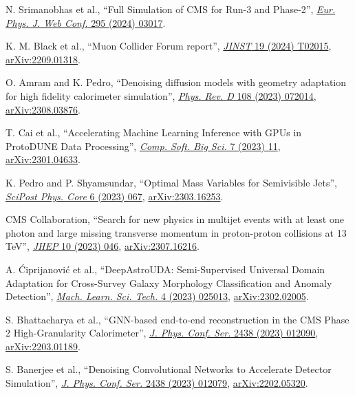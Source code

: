 \begin{nbdescription}[leftmargin=12pt,font=\normalfont,labelsep=0em]
\item N. Srimanobhas et al., ``Full Simulation of CMS for Run-3 and Phase-2'', \href{https://doi.org/10.1051/epjconf/202429503017}{\emph{Eur. Phys. J. Web Conf.} 295 (2024) 03017}. %
\item K. M. Black et al., ``Muon Collider Forum report'', \href{https://doi.org/10.1088/1748-0221/19/02/T02015}{\emph{JINST} 19 (2024) T02015}, \href{https://arxiv.org/abs/2209.01318}{arXiv:2209.01318}. %
\item O. Amram and K. Pedro, ``Denoising diffusion models with geometry adaptation for high fidelity calorimeter simulation'', \href{https://doi.org/10.1103/PhysRevD.108.072014}{\emph{Phys. Rev. D} 108 (2023) 072014}, \href{https://arxiv.org/abs/2308.03876}{arXiv:2308.03876}. %
\item T. Cai et al., ``Accelerating Machine Learning Inference with GPUs in ProtoDUNE Data Processing'', \href{https://doi.org/10.1007/s41781-023-00101-0}{\emph{Comp. Soft. Big Sci.} 7 (2023) 11}, \href{https://arxiv.org/abs/2301.04633}{arXiv:2301.04633}. %
\item \begin{sloppypar}K. Pedro and P. Shyamsundar, ``Optimal Mass Variables for Semivisible Jets'', \href{https://doi.org/10.21468/SciPostPhysCore.6.4.067}{\emph{SciPost Phys. Core} 6 (2023) 067}, \href{https://arxiv.org/abs/2303.16253}{arXiv:2303.16253}.\end{sloppypar} %
\item CMS Collaboration, ``Search for new physics in multijet events with at least one photon and large missing transverse momentum in proton-proton collisions at 13 TeV'', \href{https://doi.org/10.1007/JHEP10(2023)046}{\emph{JHEP} 10 (2023) 046}, \href{https://arxiv.org/abs/2307.16216}{arXiv:2307.16216}. %
\item A. \'Ciprijanovi\'c et al., ``DeepAstroUDA: Semi-Supervised Universal Domain Adaptation for Cross-Survey Galaxy Morphology Classification and Anomaly Detection'', \href{https://doi.org/10.1088/2632-2153/acca5f}{\emph{Mach. Learn. Sci. Tech.} 4 (2023) 025013}, \href{https://arxiv.org/abs/2302.02005}{arXiv:2302.02005}. %
\item S. Bhattacharya et al., ``GNN-based end-to-end reconstruction in the CMS Phase 2 High-Granularity Calorimeter'', \href{https://doi.org/10.1088/1742-6596/2438/1/012090}{\emph{J. Phys. Conf. Ser.} 2438 (2023) 012090}, \href{https://arxiv.org/abs/2203.01189}{arXiv:2203.01189}. %
\item S. Banerjee et al., ``Denoising Convolutional Networks to Accelerate Detector Simulation'', \href{https://doi.org/10.1088/1742-6596/2438/1/012079}{\emph{J. Phys. Conf. Ser.} 2438 (2023) 012079}, \href{https://arxiv.org/abs/2202.05320}{arXiv:2202.05320}. %

\end{nbdescription}
